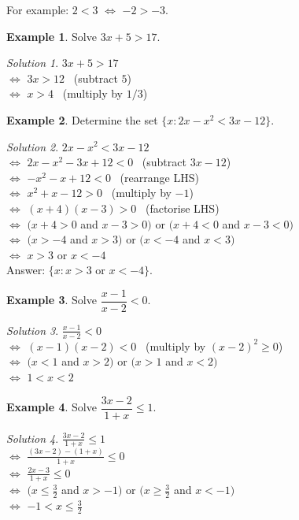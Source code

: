 \documentclass[
  english,
  12pt,
  oneside]{book}
\theoremstyle{definition}
\theoremstyle{definition}
\newtheorem{example}{Example}[chapter]
\theoremstyle{definition}
\theoremstyle{definition}
\theoremstyle{remark}
\newtheorem*{solution}{Solution}
\begin{document}
For example: \(2<3\) \(\iff\) \(-2>-3\).

\begin{example}
Solve \(3x+5>17\).
\end{example}

\begin{solution}
\(3x+5>17\)\\
\(\iff\) \(3x>12\) \hfill~{(subtract \(5\))}\\
\(\iff\) \(x>4\) \hfill~{(multiply by \(1/3\))}
\end{solution}

\begin{example}
Determine the set \(\{x: 2x-x^2<3x-12\}\).
\end{example}

\begin{solution}
\(2x-x^2<3x-12\)\\
\(\iff\) \(2x-x^2-3x+12<0\) \hfill~{(subtract \(3x-12\))}\\
\(\iff\) \(-x^2-x+12<0\) \hfill~{(rearrange LHS)}\\
\(\iff\) \(x^2+x-12>0\) \hfill~{(multiply by \(-1\))}\\
\(\iff\) \((x+4)(x-3)>0\) \hfill~{(factorise LHS)}\\
\(\iff\) \(\big( x+4>0\) and \(x-3>0\big)\) or \(\big(x+4<0\) and \(x-3<0\big)\)\\
\(\iff\) \(\big( x>-4\) and \(x>3\big)\) or \(\big(x<-4\) and \(x<3\big)\)\\
\(\iff\) \(x>3\) or \(x<-4\)\\
Answer: \(\{x: x>3\text{ or }x<-4\}\).
\end{solution}

\begin{example}
Solve \(\dfrac{x-1}{x-2}<0\).
\end{example}

\begin{solution}
\(\frac{x-1}{x-2}<0\)\\
\(\iff\) \((x-1)(x-2)<0\) \hfill~{(multiply by \((x-2)^2\geq 0\))}\\
\(\iff\) \(\big( x<1\) and \(x>2\big)\) or \(\big(x>1\) and \(x<2\big)\)\\
\(\iff\) \(1<x<2\)
\end{solution}

\begin{example}
Solve \(\dfrac{3x-2}{1+x}\leq 1\).
\end{example}

\begin{solution}
\(\frac{3x-2}{1+x}\leq1\)\\
\(\iff\) \(\frac{(3x-2)-(1+x)}{1+x}\leq0\)\\
\(\iff\) \(\frac{2x-3}{1+x}\leq0\)\\
\(\iff\) \(\big( x\leq\frac{3}{2}\) and \(x>-1\big)\) or \(\big(x\geq \frac{3}{2}\) and \(x<-1\big)\)\\
\(\iff\) \(-1<x\leq\frac{3}{2}\)
\end{solution}
\end{document}
